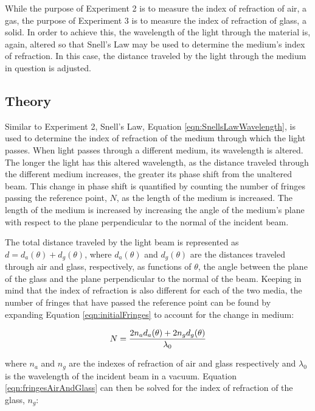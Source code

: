 \documentclass[12pt]{article}
\begin{document}
\qq While the purpose of Experiment 2 is to measure the index of refraction of
air, a gas, the purpose of Experiment 3 is to measure the index of refraction of
glass, a solid. In order to achieve this, the wavelength of the light through
the material is, again, altered so that Snell's Law may be used to determine the
medium's index of refraction. In this case, the distance traveled by the light
through the medium in question is adjusted.

\subsection{Theory}

\qq Similar to Experiment 2, Snell's Law, Equation
\ref{eqn:SnellsLawWavelength}, is used to determine the index of refraction of
the medium through which the light passes. When light passes through a different
medium, its wavelength is altered. The longer the light has this altered
wavelength, as the distance traveled through the different medium increases, the
greater its phase shift from the unaltered beam. This change in phase shift is
quantified by counting the number of fringes passing the reference point, \(N\),
as the length of the medium is increased. The length of the medium is increased
by increasing the angle of the medium's plane with respect to the plane
perpendicular to the normal of the incident beam. 

\qq The total distance traveled by the light beam is represented as \(d =
d_a(\theta) + d_g(\theta)\), where \(d_a(\theta)\) and \(d_g(\theta)\) are the
distances traveled through air and glass, respectively, as functions of
\(\theta\), the angle between the plane of the glass and the plane perpendicular
to the normal of the beam. Keeping in mind that the index of refraction is also
different for each of the two media, the number of fringes that have passed the
reference point can be found by expanding Equation \ref{eqn:initialFringes} to
account for the change in medium:

\begin{equation}
  \label{eqn:fringesAirAndGlass}
  N = \frac{2 n_a d_a(\theta) + 2 n_g d_g(\theta)}{\lambda_0} \\
\end{equation}

where \(n_a\) and \(n_g\) are the indexes of refraction of air and glass
respectively and \(\lambda_0\) is the wavelength of the
incident beam in a vacuum. Equation \ref{eqn:fringesAirAndGlass} can then be
solved for the index of refraction of the glass, \(n_g\):
\end{document}
